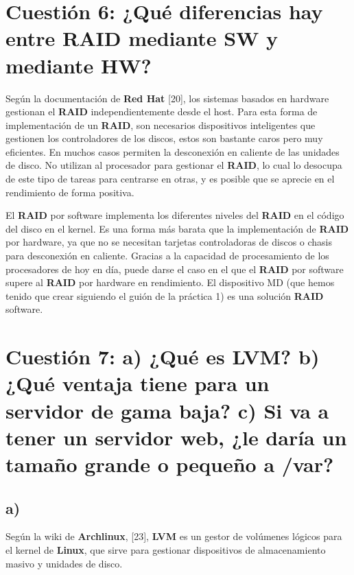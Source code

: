 \section{Cuestión 6: ¿Qué diferencias hay entre RAID mediante SW y mediante HW?}

Según la documentación de \textbf{Red Hat} [20], los sistemas basados en hardware gestionan el \textbf{RAID} independientemente desde el host. Para esta forma de implementación de un \textbf{RAID}, son necesarios dispositivos inteligentes que gestionen los controladores de los discos, estos son bastante caros pero muy eficientes. En muchos casos permiten la desconexión en caliente de las unidades de disco. No utilizan al procesador para gestionar el \textbf{RAID}, lo cual lo desocupa de este tipo de tareas para centrarse en otras, y es posible que se aprecie en el rendimiento de forma positiva.

El \textbf{RAID} por software implementa los diferentes niveles del \textbf{RAID} en el código del disco en el kernel. Es una forma más barata que la implementación de \textbf{RAID} por hardware, ya que no se necesitan tarjetas controladoras de discos o chasis para desconexión en caliente. Gracias a la capacidad de procesamiento de los procesadores de hoy en día, puede darse el caso en el que el \textbf{RAID} por software supere al \textbf{RAID} por hardware en rendimiento.
El dispositivo MD (que hemos tenido que crear siguiendo el guión de la práctica 1) es una solución \textbf{RAID} software.



\section{Cuestión 7: a) ¿Qué es LVM? b)¿Qué ventaja tiene para un servidor de
gama baja? c) Si va a tener un servidor web, ¿le daría un tamaño grande o
pequeño a /var?}

\subsection{a)}
Según la wiki de \textbf{Archlinux}, [23], \textbf{LVM} es un gestor de volúmenes lógicos para el kernel de \textbf{Linux}, que sirve para gestionar dispositivos de almacenamiento masivo y unidades de disco.

